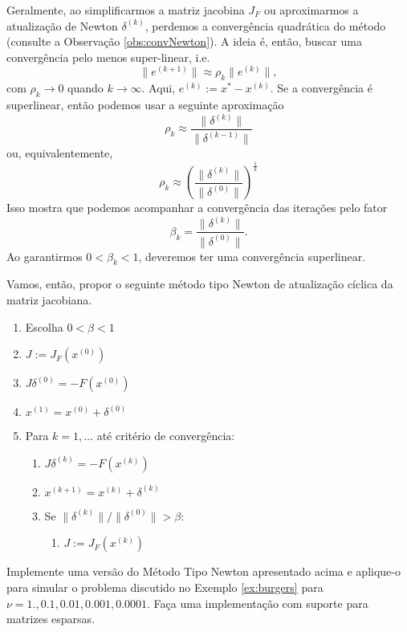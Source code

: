Geralmente, ao simplificarmos a matriz jacobina $J_F$ ou aproximarmos a atualização de Newton $\delta^{(k)}$, perdemos a convergência quadrática do método (consulte a Observação \ref{obs:convNewton}). A ideia é, então, buscar uma convergência pelo menos super-linear, i.e.
\begin{equation}
  \|e^{(k+1)}\|\approx \rho_k\|e^{(k)}\|,
\end{equation}
com $\rho_k\to 0$ quando $k\to\infty$. Aqui, $e^{(k)}:=x^*-x^{(k)}$. Se a convergência é superlinear, então podemos usar a seguinte aproximação
\begin{equation}
  \rho_k \approx \frac{\|\delta^{(k)}\|}{\|\delta^{(k-1)}\|}
\end{equation}
ou, equivalentemente,
\begin{equation}
  \rho_k \approx \left(\frac{\|\delta^{(k)}\|}{\|\delta^{(0)}\|}\right)^{\frac{1}{k}}
\end{equation}
Isso mostra que podemos acompanhar a convergência das iterações pelo fator
\begin{equation}
  \beta_k = \frac{\|\delta^{(k)}\|}{\|\delta^{(0)}\|}.
\end{equation}
Ao garantirmos $0<\beta_k<1$, deveremos ter uma convergência superlinear.

Vamos, então, propor o seguinte  método tipo Newton de atualização cíclica da matriz jacobiana.
\begin{enumerate}
\item Escolha $0<\beta<1$
\item $J := J_F(x^{(0)})$
\item $J\delta^{(0)}=-F(x^{(0)})$
\item $x^{(1)} = x^{(0)} + \delta^{(0)}$
\item Para $k=1,\ldots$ até critério de convergência:
  \begin{enumerate}
  \item $J\delta^{(k)}=-F(x^{(k)})$
  \item $x^{(k+1)}=x^{(k)} + \delta^{(k)}$
  \item Se $\|\delta^{(k)}\|/\|\delta^{(0)}\| > \beta$:
    \begin{enumerate}
    \item $J := J_F(x^{(k)})$
    \end{enumerate}
  \end{enumerate}
\end{enumerate}

\begin{exer}
  Implemente uma versão do Método Tipo Newton apresentado acima e aplique-o para simular o problema discutido no Exemplo \ref{ex:burgers} para $\nu = 1., 0.1, 0.01, 0.001, 0.0001$. Faça uma implementação com suporte para matrizes esparsas.
\end{exer}

